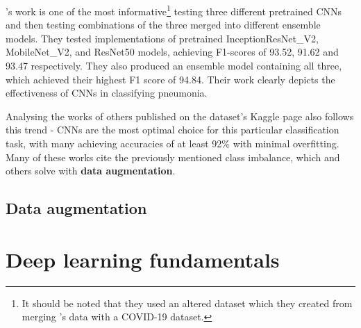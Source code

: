 \documentclass[12pt]{report}
\newcommand{\para}{\vspace{7pt}\noindent}
\begin{document}
\para \textcite{elasnaouiDesignEnsembleDeep2021a}'s work is one of the most informative\footnote{It should be noted that they used an altered dataset which they created from merging \textcite{kermanyIdentifyingMedicalDiagnoses2018}'s data with a COVID-19 dataset.}
testing three different pretrained CNNs and then testing combinations of the three merged into different ensemble models. 
They tested implementations of pretrained InceptionResNet\_V2, MobileNet\_V2, and ResNet50 models, achieving F1-scores of 93.52, 91.62 and 93.47 
respectively. They also produced an ensemble model containing all three, which achieved their highest F1 score of 94.84. Their work clearly 
depicts the effectiveness of CNNs in classifying pneumonia.

\para Analysing the works of others published on the dataset's Kaggle page also follows this trend - CNNs are the most optimal choice for this 
particular classification task, with many achieving accuracies of at least 92\% with minimal overfitting. Many of these works cite the previously 
mentioned class imbalance, which \textcite{mathurPneumoniaDetectionUsing2020} and others solve with \textbf{data augmentation}. 

\newpage
\section{Data augmentation}



\chapter{Deep learning fundamentals}



\end{document}
